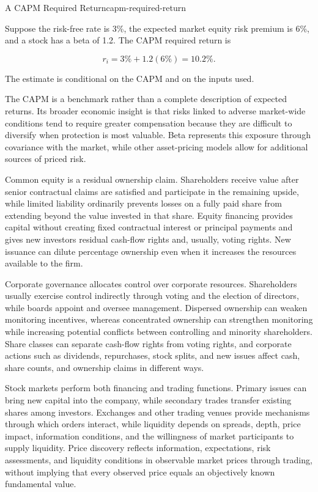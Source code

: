 \begin{example}{A CAPM Required Return}{capm-required-return}

Suppose the risk-free rate is 3\%, the expected market equity risk premium is 6\%, and a stock has a beta of 1.2. The CAPM required return is

\[
r_i
=
3\%+1.2(6\%)
=
10.2\%.
\]

The estimate is conditional on the CAPM and on the inputs used.

\end{example}
The CAPM is a benchmark rather than a complete description of expected returns. Its broader economic insight is that risks linked to adverse market-wide conditions tend to require greater compensation because they are difficult to diversify when protection is most valuable. Beta represents this exposure through covariance with the market, while other asset-pricing models allow for additional sources of priced risk.



Common equity is a residual ownership claim. Shareholders receive value after senior contractual claims are satisfied and participate in the remaining upside, while limited liability ordinarily prevents losses on a fully paid share from extending beyond the value invested in that share. Equity financing provides capital without creating fixed contractual interest or principal payments and gives new investors residual cash-flow rights and, usually, voting rights. New issuance can dilute percentage ownership even when it increases the resources available to the firm.

Corporate governance allocates control over corporate resources. Shareholders usually exercise control indirectly through voting and the election of directors, while boards appoint and oversee management. Dispersed ownership can weaken monitoring incentives, whereas concentrated ownership can strengthen monitoring while increasing potential conflicts between controlling and minority shareholders. Share classes can separate cash-flow rights from voting rights, and corporate actions such as dividends, repurchases, stock splits, and new issues affect cash, share counts, and ownership claims in different ways.

Stock markets perform both financing and trading functions. Primary issues can bring new capital into the company, while secondary trades transfer existing shares among investors. Exchanges and other trading venues provide mechanisms through which orders interact, while liquidity depends on spreads, depth, price impact, information conditions, and the willingness of market participants to supply liquidity. Price discovery reflects information, expectations, risk assessments, and liquidity conditions in observable market prices through trading, without implying that every observed price equals an objectively known fundamental value.

